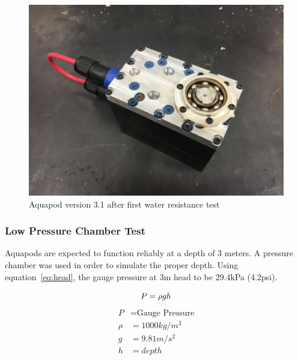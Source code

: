 \begin{figure}[h]
\centering
\includegraphics[width=1.0\columnwidth]{./img/aquaPod-test-one-rust.JPG}
\caption{Aquapod version 3.1 after first water resistance test}
\label{fig:pod rust}
\end{figure}



\subsubsection{Low Pressure Chamber Test}
Aquapods are expected to function reliably at a depth of 3 meters. A pressure chamber was used in order to simulate the proper depth. Using equation~\ref{eq:head}, the gauge pressure at 3m head to be 29.4kPa (4.2psi).

\begin{equation}\label{eq:head}
    P = \rho g h \\
\end{equation}
\begin{align*}
    P & = \text{Gauge Pressure}  \\
    \rho & = 1000 kg/m^3 \\
    g & = 9.81 m/s^2 \\
    h & = depth  \\
\end{align*}

